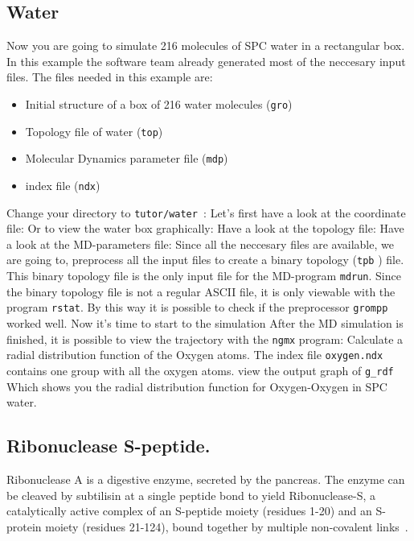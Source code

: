 \subsection{Water}
Now you are going to simulate 216 molecules of SPC water
\cite{Berendsen81} in a rectangular box. In this example the {\gromacs
} software team already generated most of the neccesary input
files. The files needed in this example are:
\begin{itemize}
\item Initial structure of a box of 216 water molecules ({\tt gro})
\item Topology file of water ({\tt top})
\item Molecular Dynamics parameter file ({\tt mdp})
\item index file ({\tt ndx})
\end{itemize}

Change your directory to {\tt tutor/water }:   
Let's first have a look at the coordinate file:
Or to view the water box graphically:
Have a look at the topology file:
Have a look at the MD-parameters file:
Since all the neccesary files are available, we are going to,
preprocess all the input files to create a binary topology ({\tt tpb}
) file. This binary topology file is the only input file for the
MD-program {\tt mdrun}. 
Since the binary topology file is not a regular ASCII file, it is only
viewable with the program {\tt rstat}. By this way it is possible to
check if the {\gromacs} preprocessor {\tt grompp} worked well.
Now it's time to start to the simulation
After the MD simulation is finished, it is possible to view the
trajectory with the {\tt ngmx} program:
Calculate a radial distribution function of the Oxygen atoms. The
index file {\tt oxygen.ndx} contains one group with all the oxygen
atoms. 
view the output graph of {\tt g\_rdf}
Which shows you the radial distribution function for Oxygen-Oxygen in
SPC water. 

\subsection{Ribonuclease S-peptide.}
Ribonuclease A is a digestive enzyme, secreted by the pancreas. The enzyme
can be cleaved by subtilisin at a single peptide bond to yield 
Ribonuclease-S, a catalytically active complex of an S-peptide moiety
(residues 1-20) and an S-protein  moiety (residues 21-124), bound together
by multiple non-covalent links~\cite{Stryer88}. 

